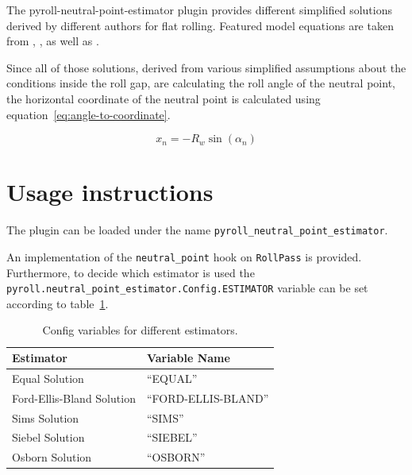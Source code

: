 \documentclass[11pt]{PyRollDocs}
\begin{document}
    The pyroll-neutral-point-estimator plugin provides different simplified solutions derived by different authors for flat rolling.
    Featured model equations are taken from \textcite{Ford1951, Bland1948}, \textcite{Sims1954}, \textcite{Siebel1925} as well as \textcite{Bryant1973}.

    Since all of those solutions, derived from various simplified assumptions about the conditions inside the roll gap, are calculating the roll angle of the neutral point, the horizontal coordinate of the neutral point is calculated using equation~\ref{eq:angle-to-coordinate}.

    \begin{equation}
        x_n = -R_w \sin\left( \alpha_n \right)
        \label{eq:angle-to-coordinate}
    \end{equation}


    \section{Usage instructions}\label{sec:usage-instructions}
    The plugin can be loaded under the name \texttt{pyroll\_neutral\_point\_estimator}.

    An implementation of the \lstinline{neutral_point} hook on \lstinline{RollPass} is provided.
    Furthermore, to decide which estimator is used the \lstinline{pyroll.neutral_point_estimator.Config.ESTIMATOR} variable can be set according to table~\ref{tab:hookspecs}.

    \begin{table}
        \centering
        \caption{Config variables for different estimators.}
        \label{tab:hookspecs}
        \begin{tabular}{ll}
            \toprule
            Estimator                 & Variable Name              \\
            \midrule
            Equal Solution            & \enquote{EQUAL}            \\
            Ford-Ellis-Bland Solution & \enquote{FORD-ELLIS-BLAND} \\
            Sims Solution             & \enquote{SIMS}             \\
            Siebel Solution           & \enquote{SIEBEL}           \\
            Osborn Solution           & \enquote{OSBORN}           \\
            \bottomrule
        \end{tabular}
    \end{table}

    \printbibliography
\end{document}
